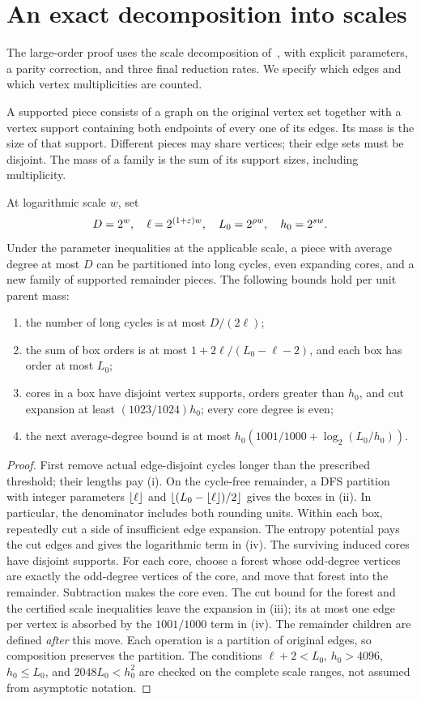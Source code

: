 \section{An exact decomposition into scales}\label{sec:layers}
The large-order proof uses the scale decomposition of~\cite{OAI2026}, with
explicit parameters, a parity correction, and three final reduction rates.
We specify which edges and which vertex multiplicities are counted.

A supported piece consists of a graph on the original vertex set together
with a vertex support containing both endpoints of every one of its edges.
Its mass is the size of that support. Different pieces may share vertices;
their edge sets must be disjoint. The mass of a family is the sum of its
support sizes, including multiplicity.

\begin{lemma}\label{lem:scale}
At logarithmic scale $w$, set
\[
 D=2^w,\quad \ell=2^{(1+\varepsilon)w},\quad L_0=2^{\rho w},\quad h_0=2^{sw}.
\]
Under the parameter inequalities at the applicable scale, a piece with
average degree at most $D$ can be partitioned into long cycles, even
expanding cores, and a new family of supported remainder pieces. The
following bounds hold per unit parent mass:
\begin{enumerate}[label=(\roman*),leftmargin=*]
\item the number of long cycles is at most $D/(2\ell)$;
\item the sum of box orders is at most
      $1+2\ell/(L_0-\ell-2)$, and each box has order at most $L_0$;
\item cores in a box have disjoint vertex supports, orders greater than
      $h_0$, and cut expansion at least $(1023/1024)h_0$; every core degree
      is even;
\item the next average-degree bound is at most
      $h_0(1001/1000+\log_2(L_0/h_0))$.
\end{enumerate}
\end{lemma}
\begin{proof}
First remove actual edge-disjoint cycles longer than the prescribed
threshold; their lengths pay (i). On the cycle-free remainder, a DFS
partition with integer parameters $\left\lfloor \ell\right\rfloor$ and
$\left\lfloor (L_0-\left\lfloor \ell\right\rfloor)/2\right\rfloor$ gives the boxes in (ii). In particular, the
denominator includes both rounding units.
Within each box, repeatedly cut a side of insufficient edge expansion.
The entropy potential pays the cut edges and gives the logarithmic term
in (iv). The surviving induced cores have disjoint supports. For each core,
choose a forest whose odd-degree vertices are exactly the odd-degree
vertices of the core, and move that forest into the remainder. Subtraction
makes the core even. The cut bound for the forest and the certified scale
inequalities leave the expansion in (iii); its at most one edge per vertex
is absorbed by the $1001/1000$ term in (iv).
The remainder children are defined \emph{after} this move. Each operation
is a partition of original edges, so composition preserves the partition.
The conditions $\ell+2<L_0$, $h_0>4096$, $h_0\le L_0$, and
$2048L_0<h_0^2$ are checked on the complete scale ranges, not assumed from
asymptotic notation.
\end{proof}


